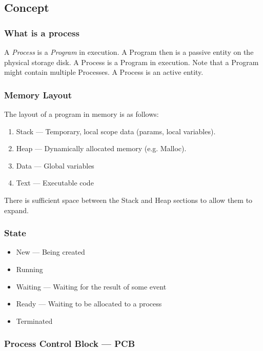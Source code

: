 \subsection{Concept}

\subsubsection{What is a process}

A \textit{Process} is a \textit{Program} in execution. A Program then is a passive entity
on the physical storage disk. A Process is a Program in execution. Note that a Program might
contain multiple Processes. A Process is an active entity.


\subsubsection{Memory Layout}

The layout of a program in memory is as follows:

\begin{enumerate}
    \item Stack --- Temporary, local scope data (params, local variables).
    \item Heap --- Dynamically allocated memory (e.g. Malloc).
    \item Data --- Global variables
    \item Text --- Executable code
\end{enumerate}

There is sufficient space between the Stack and Heap sections to allow them to expand.


\subsubsection{State}

\begin{itemize}
    \item New --- Being created
    \item Running
    \item Waiting --- Waiting for the result of some event
    \item Ready --- Waiting to be allocated to a process
    \item Terminated
\end{itemize}


\subsubsection{Process Control Block --- PCB}

